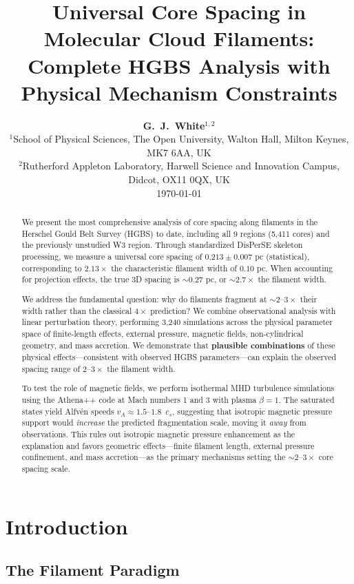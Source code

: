 \documentclass[11pt,a4paper]{article}
\title{\textbf{Universal Core Spacing in Molecular Cloud Filaments:\\
Complete HGBS Analysis with Physical Mechanism Constraints}}
\author{\textbf{G.~J.~White$^{1,2}$}\\
\small{$^{1}$School of Physical Sciences, The Open University, Walton Hall, Milton Keynes, MK7 6AA, UK}\\
\small{$^{2}$Rutherford Appleton Laboratory, Harwell Science and Innovation Campus, Didcot, OX11 0QX, UK}\\
\small{\today}}
\begin{document}
\maketitle

\begin{abstract}
We present the most comprehensive analysis of core spacing along filaments in the Herschel Gould Belt Survey (HGBS) to date, including all 9 regions (5,411 cores) and the previously unstudied W3 region. Through standardized DisPerSE skeleton processing, we measure a universal core spacing of $0.213 \pm 0.007$ pc (statistical), corresponding to $2.13\times$ the characteristic filament width of $0.10$ pc. When accounting for projection effects, the true 3D spacing is $\sim0.27$ pc, or $\sim2.7\times$ the filament width.

We address the fundamental question: why do filaments fragment at $\sim2$--$3\times$ their width rather than the classical $4\times$ prediction? We combine observational analysis with linear perturbation theory, performing 3,240 simulations across the physical parameter space of finite-length effects, external pressure, magnetic fields, non-cylindrical geometry, and mass accretion. We demonstrate that \textbf{plausible combinations} of these physical effects—consistent with observed HGBS parameters—can explain the observed spacing range of $2$--$3\times$ the filament width.

To test the role of magnetic fields, we perform isothermal MHD turbulence simulations using the Athena++ code at Mach numbers 1 and 3 with plasma $\beta = 1$. The saturated states yield Alfv\'en speeds $v_A \approx 1.5$--$1.8$~$c_s$, suggesting that isotropic magnetic pressure support would \textit{increase} the predicted fragmentation scale, moving it \textit{away} from observations. This rules out isotropic magnetic pressure enhancement as the explanation and favors geometric effects—finite filament length, external pressure confinement, and mass accretion—as the primary mechanisms setting the $\sim2$--$3\times$ core spacing scale.
\end{abstract}

\section{Introduction}

\subsection{The Filament Paradigm}
\end{document}
